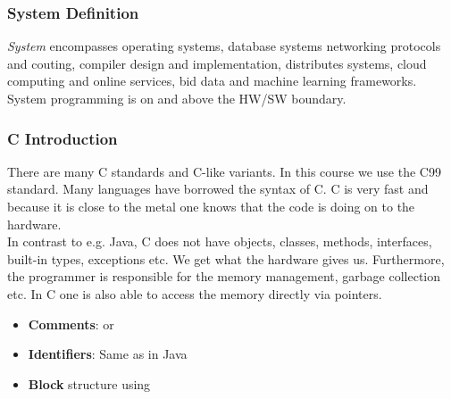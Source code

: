 \subsubsection{System Definition}
\textit{System} encompasses operating systems, database systems networking protocols and couting, compiler design and implementation, distributes systems, cloud computing and online services, bid data and machine learning frameworks. System programming is on and above the HW/SW boundary.

\subsubsection{C Introduction}
There are many C standards and C-like variants. In this course we use the C99 standard. Many languages have borrowed the syntax of C. C is very fast and because it is close to the metal one knows that the code is doing on to the hardware.\\
In contrast to e.g. Java, C does not have objects, classes, methods, interfaces, built-in types, exceptions etc. We get what the hardware gives us. Furthermore, the programmer is responsible for the memory management, garbage collection etc. In C one is also able to access the memory directly via pointers.
\begin{itemize}
    \item \textbf{Comments}:  or \code{//}
    \item \textbf{Identifiers}: Same as in Java
    \item \textbf{Block} structure using 
\end{itemize}
